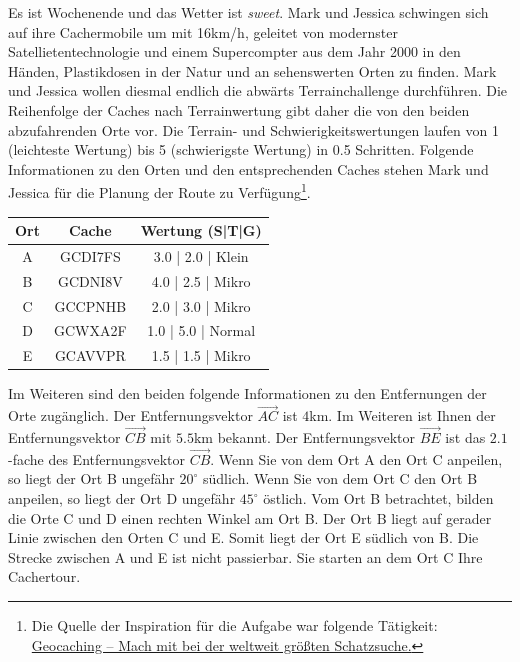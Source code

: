 \documentclass[a4paper, 9pt]{scrartcl}\usepackage[]{graphicx}\usepackage[]{xcolor}
\begin{document}
Es ist Wochenende und das Wetter ist \textit{sweet}. Mark und Jessica schwingen sich auf ihre Cachermobile um mit 16km/h, geleitet von modernster Satellietentechnologie und einem Supercompter aus dem Jahr 2000 in den Händen, Plastikdosen in der Natur und an sehenswerten Orten zu finden. Mark und Jessica wollen diesmal endlich die abwärts Terrainchallenge durchführen. Die Reihenfolge der Caches nach Terrainwertung gibt daher die von den beiden abzufahrenden Orte vor. Die Terrain- und Schwierigkeitswertungen laufen von 1 (leichteste Wertung) bis 5 (schwierigste Wertung) in 0.5 Schritten. Folgende Informationen zu den Orten und den entsprechenden Caches stehen Mark und Jessica für die Planung der Route zu Verfügung\footnote{Die Quelle der Inspiration für die Aufgabe war folgende Tätigkeit: \href{https://www.geocaching.com/play}{Geocaching -- Mach mit bei der weltweit größten Schatzsuche.}}.

\begin{center}
  \begin{tabular}{ ccc }
    \toprule
    Ort & Cache & Wertung (S|T|G) \\
    \midrule
    A & GCDI7FS & 3.0 | 2.0 | Klein \\
    B & GCDNI8V & 4.0 | 2.5 | Mikro \\ 
    C & GCCPNHB & 2.0 | 3.0 | Mikro \\ 
    D & GCWXA2F & 1.0 | 5.0 | Normal \\ 
    E & GCAVVPR & 1.5 | 1.5 | Mikro \\     
 \bottomrule
\end{tabular}
\end{center}

Im Weiteren sind den beiden folgende Informationen zu den Entfernungen der Orte zugänglich. Der Entfernungsvektor $\overrightarrow{AC}$ ist $4$km. Im Weiteren ist Ihnen der Entfernungsvektor $\overrightarrow{CB}$ mit $5.5$km bekannt. Der Entfernungsvektor $\overrightarrow{BE}$ ist das $2.1$-fache des Entfernungsvektor $\overrightarrow{CB}$. Wenn Sie von dem Ort A den Ort C anpeilen, so liegt der Ort B ungefähr $20^\circ$ südlich. Wenn Sie von dem Ort C den Ort B anpeilen, so liegt der Ort D ungefähr $45^\circ$ östlich. Vom Ort B betrachtet, bilden die Orte C und D einen rechten Winkel am Ort B. Der Ort B liegt auf gerader Linie zwischen den Orten C und E. Somit liegt der Ort E südlich von B. Die Strecke zwischen A und E ist nicht passierbar. Sie starten an dem Ort C Ihre Cachertour. \\
\end{document}
